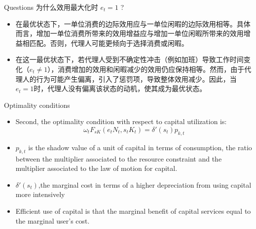 \documentclass[fontset=windows,12pt,t,aspectratio=169]{beamer}
\begin{document}
\setlength{\parskip}{1em}
\begin{frame}{Questions}
    \quad  为什么效用最大化时 $e_t = 1$ ?
    \begin{itemize}
        \item 在最优状态下，一单位消费的边际效用应与一单位闲暇的边际效用相等。具体而言，增加一单位消费所带来的效用增益应与增加一单位闲暇所带来的效用增益相匹配。否则，代理人可能更倾向于选择消费或闲暇。
        \item 在这一最优状态下，若代理人受到不确定性冲击（例如加班）导致工作时间变化（$e_t \neq 1$），消费增加的效用和闲暇减少的效用仍应保持相等。然而，由于代理人的行为可能产生偏离，引入了惩罚项，导致整体效用减少。因此，当$e_t = 1$时，代理人没有偏离该状态的动机，使其成为最优状态。
    \end{itemize}
\end{frame}


\begin{frame}{Optimality conditions}
    \begin{itemize}
        \item Second, the optimality condition with respect to capital utilization is:
        \begin{equation}
        \omega_t F_{sK}(e_t N_t, s_t K_t) = \delta'(s_t) p_{k,t} \tag{7}
        \end{equation}
        \item $p_{k,t}$ is the shadow value of a unit of capital in terms of consumption, the ratio between the multiplier associated to the resource constraint and the multiplier associated to the law of motion for capital.
        \item $\delta'(s_t)$,the marginal cost in terms of a higher depreciation from using capital more intensively
        \item Efficient use of capital is that the marginal benefit of capital services equal to the marginal user's cost.
    \end{itemize}
\end{frame}
\end{document}
